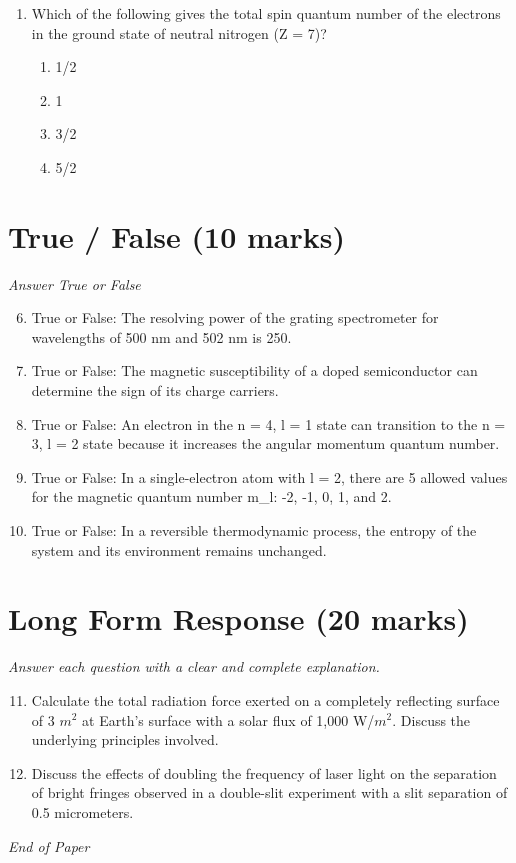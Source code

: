 \documentclass[12pt]{article}
\begin{document}
\begin{enumerate}[label=\arabic*.]
\begin{enumerate}[label=(\alph*)]
    \item an excimer laser
    \item a ruby laser
\end{enumerate}
\item Which of the following gives the total spin quantum number of the electrons in the ground state of neutral nitrogen (Z = 7)?
\begin{enumerate}[label=(\alph*)]
    \item 1/2
    \item 1
    \item 3/2
    \item 5/2
\end{enumerate}
\end{enumerate}

\section*{True / False (10 marks)}
\textit{Answer True or False}
\begin{enumerate}[label=\arabic*.]
\setcounter{enumi}{5}
\item True or False: The resolving power of the grating spectrometer for wavelengths of 500 nm and 502 nm is 250.
\item True or False: The magnetic susceptibility of a doped semiconductor can determine the sign of its charge carriers.
\item True or False: An electron in the n = 4, l = 1 state can transition to the n = 3, l = 2 state because it increases the angular momentum quantum number.
\item True or False: In a single-electron atom with l = 2, there are 5 allowed values for the magnetic quantum number m\_l: -2, -1, 0, 1, and 2.
\item True or False: In a reversible thermodynamic process, the entropy of the system and its environment remains unchanged.
\end{enumerate}

\section*{Long Form Response (20 marks)}
\textit{Answer each question with a clear and complete explanation.}
\begin{enumerate}[label=\arabic*.]
\setcounter{enumi}{10}
\item Calculate the total radiation force exerted on a completely reflecting surface of 3 $m^2$ at Earth's surface with a solar flux of 1,000 W/$m^2$. Discuss the underlying principles involved.
\item Discuss the effects of doubling the frequency of laser light on the separation of bright fringes observed in a double-slit experiment with a slit separation of 0.5 micrometers.
\end{enumerate}

\vfill
\noindent\textit{End of Paper}
\end{document}
